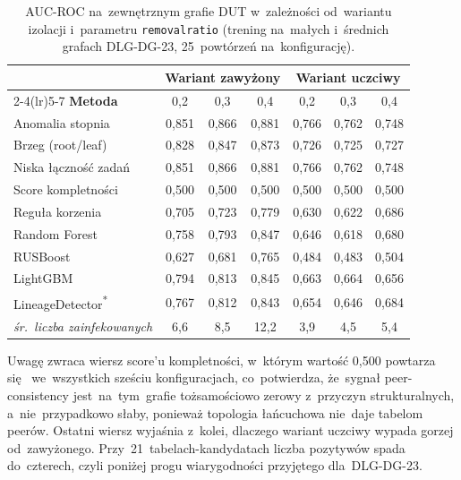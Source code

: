 \documentclass[polish,master,a4paper,oneside]{ppfcmthesis}
\renewcommand{\_}{\origtextunderscore\ifmmode\else\allowbreak\fi}
\begin{document}
\begin{table}[ht]
\centering
\caption[AUC-ROC na~grafie DUT w~wariantach izolacji]{AUC-ROC na~zewnętrznym grafie DUT w~zależności od~wariantu izolacji
i~parametru \texttt{removal\_ratio} (trening na~małych i~średnich grafach
DLG-DG-23, 25~powtórzeń na~konfigurację).}
\label{tab:dod-sweep}
\small
\begin{tabular}{lcccccc}
\toprule
& \multicolumn{3}{c}{\textbf{Wariant zawyżony}} &
  \multicolumn{3}{c}{\textbf{Wariant uczciwy}} \\
\cmidrule(lr){2-4}\cmidrule(lr){5-7}
\textbf{Metoda} & 0{,}2 & 0{,}3 & 0{,}4 & 0{,}2 & 0{,}3 & 0{,}4 \\
\midrule
Anomalia stopnia     & 0{,}851 & 0{,}866 & 0{,}881 & 0{,}766 & 0{,}762 & 0{,}748 \\
Brzeg (root/leaf)    & 0{,}828 & 0{,}847 & 0{,}873 & 0{,}726 & 0{,}725 & 0{,}727 \\
Niska łączność zadań & 0{,}851 & 0{,}866 & 0{,}881 & 0{,}766 & 0{,}762 & 0{,}748 \\
Score kompletności   & 0{,}500 & 0{,}500 & 0{,}500 & 0{,}500 & 0{,}500 & 0{,}500 \\
Reguła korzenia      & 0{,}705 & 0{,}723 & 0{,}779 & 0{,}630 & 0{,}622 & 0{,}686 \\
\midrule
Random Forest        & 0{,}758 & 0{,}793 & 0{,}847 & 0{,}646 & 0{,}618 & 0{,}680 \\
RUSBoost             & 0{,}627 & 0{,}681 & 0{,}765 & 0{,}484 & 0{,}483 & 0{,}504 \\
LightGBM             & 0{,}794 & 0{,}813 & 0{,}845 & 0{,}663 & 0{,}664 & 0{,}656 \\
LineageDetector\textsuperscript{*} & 0{,}767 & 0{,}812 & 0{,}843 & 0{,}654 & 0{,}646 & 0{,}684 \\
\midrule
\emph{śr.\ liczba zainfekowanych} & 6{,}6 & 8{,}5 & 12{,}2 & 3{,}9 & 4{,}5 & 5{,}4 \\
\bottomrule
\end{tabular}
\end{table}

Uwagę zwraca wiersz score'u kompletności, w~którym wartość 0{,}500 powtarza się~
we~wszystkich sześciu konfiguracjach, co~potwierdza, że~sygnał
peer-consistency jest~na~tym~grafie tożsamościowo zerowy z~przyczyn
strukturalnych, a~nie~przypadkowo słaby, ponieważ topologia łańcuchowa nie~daje
tabelom peerów. Ostatni wiersz wyjaśnia z~kolei, dlaczego wariant uczciwy
wypada gorzej od~zawyżonego. Przy~21~tabelach-kandydatach liczba pozytywów
spada do~czterech, czyli poniżej progu wiarygodności przyjętego dla~DLG-DG-23.

\ppcolophon
\end{document}
